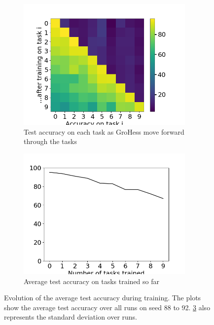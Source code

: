\documentclass[11pt]{article}
\begin{document}
\begin{figure}
    \centering
    \begin{subfigure}[b]{0.35\textwidth}
        \centering
        \includegraphics[width=0.95\textwidth]{images/accs_matrix_greedy_HPO_GroHess_from_output_pMNIST_via_torch_standard_2024-07-16_20-41-35.png}
        \caption{Test accuracy on each task as GroHess move forward through the tasks}
        \label{fig:test_accs_matrix}
    \end{subfigure}
    \hspace{-0mm}
    \begin{subfigure}[b]{0.35\textwidth}
        \centering
        \includegraphics[width=0.95\textwidth]{images/avg_acc_curve_greedy_HPO_GroHess_from_output_pMNIST_via_torch_standard_2024-07-16_20-41-35.png}
        \caption{Average test accuracy on tasks trained so far}
        \label{fig:classic_plot}
    \end{subfigure}
    \caption{Evolution of the average test accuracy during training. The plots show the average test accuracy over all runs on seed 88 to 92. \ref{fig:classic_plot} also represents the standard deviation over runs.}
\end{figure}
\end{document}
